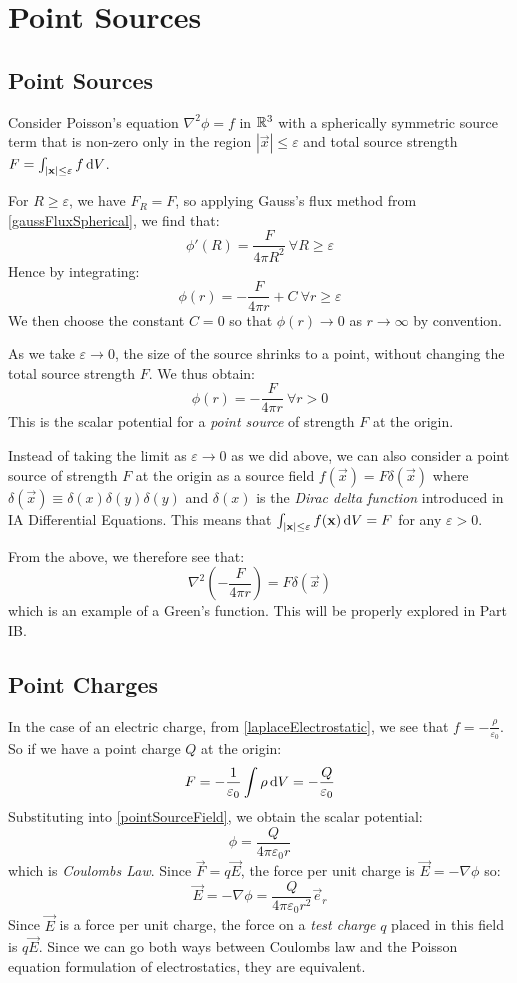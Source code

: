 \documentclass[../main.tex]{subfiles}
\begin{document}
\section{Point Sources}
\subsection{Point Sources}
\label{pointSources}
Consider Poisson's equation $\nabla^2 \phi = f$ in $\mathbb{R}^3$ with a spherically symmetric source term that is non-zero only in the region $|\vec{x}| \leq \varepsilon$ and total source strength $F = \int_{|\vec{x}| \leq \varepsilon} f \d{V}$.

For $R \geq \varepsilon$, we have $F_R = F$, so applying Gauss's flux method from \cref{gaussFluxSpherical}, we find that:
\[
  \phi'(R) = \frac{F}{4 \pi R^2}\ \forall R \geq \varepsilon
\]
Hence by integrating:
\[
  \phi(r) = -\frac{F}{4\pi r} + C\ \forall r \geq \varepsilon
\]
We then choose the constant $C = 0$ so that $\phi(r) \to 0$ as $r \to \infty$ by convention.

As we take $\varepsilon \to 0$, the size of the source shrinks to a point, without changing the total source strength $F$.
We thus obtain:
\begin{equation}
  \phi(r) = -\frac{F}{4\pi r}\ \forall r > 0 \label{pointSourceField}
\end{equation}
This is the scalar potential for a \textit{point source} of strength $F$ at the origin.
\begin{remark}
  \nonexaminable
  Instead of taking the limit as $\varepsilon \to 0$ as we did above, we can also consider a point source of strength $F$ at the origin as a source field $f(\vec{x}) = F\delta(\vec{x})$ where $\delta(\vec{x}) \equiv \delta(x)\delta(y)\delta(y)$ and $\delta(x)$ is the \textit{Dirac delta function} introduced in IA Differential Equations.
  This means that $\int_{|\vec{x}| \leq \varepsilon} f(\vec{x}) \d{V} = F$ for any $\varepsilon > 0$.

  From the above, we therefore see that:
  \[
    \nabla^2\left(-\frac{F}{4\pi r}\right) = F\delta(\vec{x})
  \]
  which is an example of a Green's function.
  This will be properly explored in Part IB.
\end{remark}
\subsection{Point Charges}
\label{pointCharge}
In the case of an electric charge, from \cref{laplaceElectrostatic}, we see that $f = -\frac{\rho}{\varepsilon_0}$.
So if we have a point charge $Q$ at the origin:
\[
  F = -\frac{1}{\varepsilon_0}\int \rho \d{V} = - \frac{Q}{\varepsilon_0}
\]
Substituting into \cref{pointSourceField}, we obtain the scalar potential:
\[
  \phi = \frac{Q}{4\pi \varepsilon_0 r}
\]
which is \textit{Coulombs Law}.
Since $\vec{F} = q\vec{E}$, the force per unit charge is $\vec{E} = -\nabla \phi$ so:
\[
  \vec{E} = -\nabla \phi = \frac{Q}{4\pi\varepsilon_0 r^2}\vec{e}_r
\]
Since $\vec{E}$ is a force per unit charge, the force on a \textit{test charge} $q$ placed in this field is $q\vec{E}$.
Since we can go both ways between Coulombs law and the Poisson equation formulation of electrostatics, they are equivalent.
\end{document}
